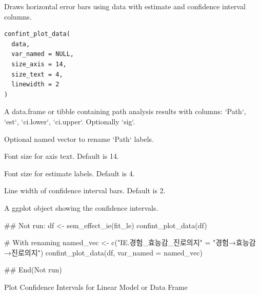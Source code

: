 \documentclass[a4paper]{book}
\begin{document}
%
\begin{Description}
Draws horizontal error bars using data with estimate and confidence interval columns.
\end{Description}
%
\begin{Usage}
\begin{verbatim}
confint_plot_data(
  data,
  var_named = NULL,
  size_axis = 14,
  size_text = 4,
  linewidth = 2
)
\end{verbatim}
\end{Usage}
%
\begin{Arguments}
\begin{ldescription}
\item[\code{data}] A data.frame or tibble containing path analysis results with columns: `Path`, `est`, `ci.lower`, `ci.upper`. Optionally `sig`.

\item[\code{var\_named}] Optional named vector to rename `Path` labels.

\item[\code{size\_axis}] Font size for axis text. Default is 14.

\item[\code{size\_text}] Font size for estimate labels. Default is 4.

\item[\code{linewidth}] Line width of confidence interval bars. Default is 2.
\end{ldescription}
\end{Arguments}
%
\begin{Value}
A ggplot object showing the confidence intervals.
\end{Value}
%
\begin{Examples}
\begin{ExampleCode}
\#\# Not run: 
df <- sem_effect_ie(fit_le)
confint_plot_data(df)

# With renaming
named_vec <- c("IE.경험_효능감_진로의지" = "경험→효능감→진로의지")
confint_plot_data(df, var_named = named_vec)

## End(Not run)
\end{ExampleCode}
\end{Examples}
%
\begin{Description}
Plot Confidence Intervals for Linear Model or Data Frame
\end{Description}
\end{document}

